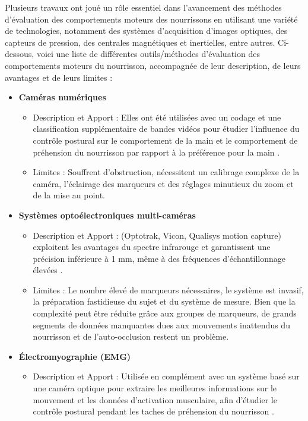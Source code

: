 \documentclass[5pt]{article}
\begin{document}
Plusieurs travaux ont joué un rôle essentiel dans l'avancement des méthodes d'évaluation des comportements moteurs des nourrissons en utilisant une variété de technologies, notamment des systèmes d'acquisition d'images optiques, des capteurs de pression, des centrales magnétiques et inertielles, entre autres. Ci-dessous, voici une liste de différentes outils/méthodes d'évaluation des comportements moteurs du nourrisson, accompagnée de leur description, de leurs avantages et de leurs limites :
\begin{itemize}
    \item \textbf{Caméras numériques}
    \begin{itemize}[label={\textbullet}, leftmargin=*]
        \item Description et Apport :  Elles ont  été utilisées avec un codage et une classification supplémentaire de bandes vidéos pour étudier l'influence du contrôle postural sur le comportement de la main\cite{rocha_influence_2008} et le comportement de préhension du nourrisson par rapport à la préférence pour la main \cite{marschik_reaching_2008}. 
        \item Limites :  Souffrent d'obstruction, nécessitent un calibrage complexe de la caméra, l'éclairage des marqueurs et des réglages minutieux du zoom et de la mise au point.
    \end{itemize}
    \item \textbf{Systèmes optoélectroniques multi-caméras}
    \begin{itemize}[label={\textbullet}, leftmargin=*]
        \item Description et Apport : (Optotrak, Vicon, Qualisys motion capture) exploitent les avantages du spectre infrarouge et garantissent une précision inférieure à 1 mm, même à des fréquences d'échantillonnage élevées \cite{petitto_baby_2004}.
        \item Limites :  Le nombre élevé de marqueurs nécessaires, le système est invasif, la préparation fastidieuse du sujet et du système de mesure. Bien que la complexité peut être réduite grâce aux groupes de marqueurs, de grands segments de données manquantes dues aux mouvements inattendus du nourrisson et de l'auto-occlusion restent un problème.
    \end{itemize}
    \item \textbf{Électromyographie (EMG)}
    \begin{itemize}[label={\textbullet}, leftmargin=*]
        \item Description et Apport : Utilisée en complément avec un système basé sur une caméra optique pour extraire les meilleures informations sur le mouvement et les données d'activation musculaire, afin d'étudier le contrôle postural pendant les taches de préhension du nourrisson \cite{van_der_fits_postural_1999,de_graaf-peters_postural_2007}.

\end{itemize}
\end{itemize}
\end{document}
